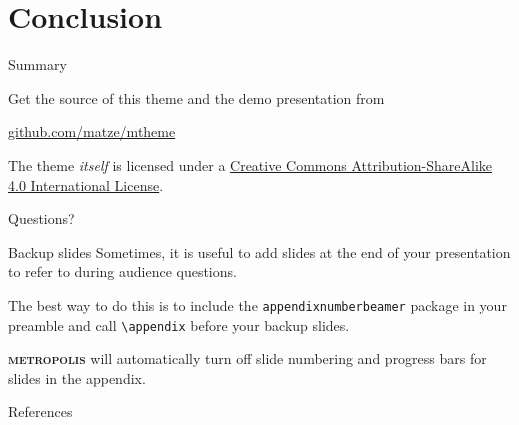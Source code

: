 \documentclass[10pt]{ctexbeamer}
\newcommand{\themename}{\textbf{\textsc{metropolis}}\xspace}
\begin{document}
\section{Conclusion}

\begin{frame}{Summary}

  Get the source of this theme and the demo presentation from

  \begin{center}\url{github.com/matze/mtheme}\end{center}

  The theme \emph{itself} is licensed under a
  \href{http://creativecommons.org/licenses/by-sa/4.0/}{Creative Commons
  Attribution-ShareAlike 4.0 International License}.

  \begin{center}\ccbysa\end{center}

\end{frame}

\begin{frame}[standout]
  Questions?
\end{frame}

\appendix

\begin{frame}[fragile]{Backup slides}
  Sometimes, it is useful to add slides at the end of your presentation to
  refer to during audience questions.

  The best way to do this is to include the \verb|appendixnumberbeamer|
  package in your preamble and call \verb|\appendix| before your backup slides.

  \themename will automatically turn off slide numbering and progress bars for
  slides in the appendix.
\end{frame}

\begin{frame}[allowframebreaks]{References}

  
  

\end{frame}
\end{document}
